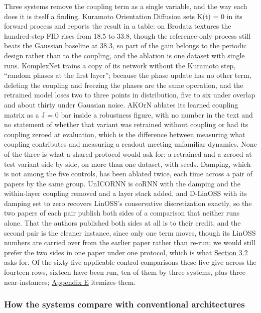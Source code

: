 \documentclass[a4paper,fleqn]{cas-sc}
\begin{document}
Three systems remove the coupling term as a single variable, and the way
each does it is itself a finding. Kuramoto Orientation Diffusion sets
K(t) = 0 in its forward process and reports the result in a table: on
Brodatz textures the hundred-step FID rises from 18.5 to 33.8, though
the reference-only process still beats the Gaussian baseline at 38.3, so
part of the gain belongs to the periodic design rather than to the
coupling, and the ablation is one dataset with single runs. KomplexNet
trains a copy of its network without the Kuramoto step, ``random phases
at the first layer''; because the phase update has no other term,
deleting the coupling and freezing the phases are the same operation,
and the retrained model loses two to three points in distribution, five
to six under overlap and about thirty under Gaussian noise. AKOrN
ablates its learned coupling matrix as a J = 0 bar inside a robustness
figure, with no number in the text and no statement of whether that
variant was retrained without coupling or had its coupling zeroed at
evaluation, which is the difference between measuring what coupling
contributes and measuring a readout meeting unfamiliar dynamics. None of
the three is what a shared protocol would ask for: a retrained and a
zeroed-at-test variant side by side, on more than one dataset, with
seeds. Damping, which is not among the five controls, has been ablated
twice, each time across a pair of papers by the same group. UnICORNN is
coRNN with the damping and the within-layer coupling removed and a layer
stack added, and D-LinOSS with its damping set to zero recovers LinOSS's
conservative discretization exactly, so the two papers of each pair
publish both sides of a comparison that neither runs alone. That the
authors published both sides at all is to their credit, and the second
pair is the cleaner instance, since only one term moves, though its
LinOSS numbers are carried over from the earlier paper rather than
re-run; we would still prefer the two sides in one paper under one
protocol, which is what \hyperref[sec-3-2]{Section 3.2} asks for. Of the
sixty-five applicable control comparisons these five give across the
fourteen rows, sixteen have been run, ten of them by three systems, plus
three near-instances; \hyperref[sec-E]{Appendix E} itemizes them.

\subsubsection{How the systems compare with conventional
architectures}\label{sec-2-3-4}
\end{document}
